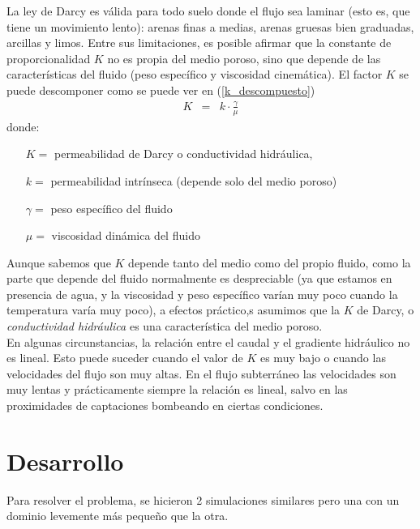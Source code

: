 \documentclass[10pt,a4paper,final]{article}
\begin{document}
%
La ley de Darcy es válida para todo suelo donde el flujo sea laminar (esto es, que tiene un movimiento lento): arenas finas a medias, arenas gruesas bien graduadas, arcillas y limos. Entre sus limitaciones, es posible afirmar que la constante de proporcionalidad $K$ no es propia del medio poroso, sino que depende de las características del fluido (peso específico y viscosidad cinemática). 
El factor $K$ se puede descomponer como se puede ver en (\ref{k_descompuesto}) 
\begin{eqnarray}
	K&=&k \cdot \frac{\gamma}{\mu} \label{k_descompuesto}
\end{eqnarray}
donde: 
\begin{itemize}
	\item[$K=$] permeabilidad de Darcy o conductividad hidráulica,
	\item[$k=$] permeabilidad intrínseca (depende solo del medio poroso)
	\item[$\gamma=$] peso específico del fluido
	\item[$\mu=$] viscosidad dinámica del fluido
\end{itemize}
Aunque sabemos que $K$ depende tanto del medio como del propio fluido, como la parte que depende del fluido normalmente es despreciable (ya que estamos en presencia de agua, y la viscosidad y peso específico varían muy poco cuando la temperatura varía muy poco), a efectos práctico,s asumimos que la $K$ de Darcy, o \emph{conductividad hidráulica} es una característica del medio poroso.
\\
En algunas circunstancias, la relación entre el caudal y el gradiente hidráulico no es lineal.
Esto puede suceder cuando el valor de $K$ es muy bajo o cuando las velocidades del flujo son muy altas.
En el flujo subterráneo las velocidades son muy lentas y prácticamente siempre la relación es lineal, salvo en las proximidades de captaciones bombeando en ciertas condiciones.
\section{Desarrollo}
Para resolver el problema, se hicieron 2 simulaciones similares pero una con un dominio levemente más pequeño que la otra.
\end{document}
